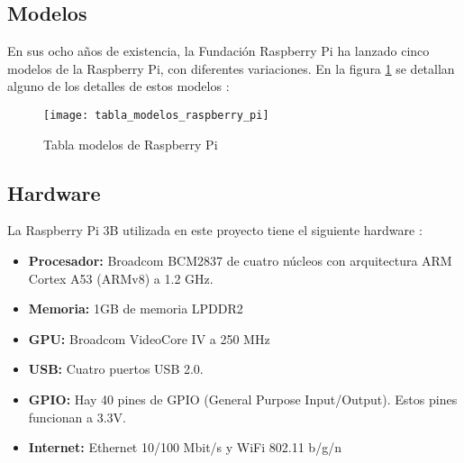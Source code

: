 
        \subsection{Modelos} %
        \label{sub:ModelosRaspberryPi}

            En sus ocho años de existencia, la Fundación Raspberry Pi ha lanzado cinco modelos de la Raspberry Pi, con
            diferentes variaciones. En la figura \ref{fig:ImagenModelosPi} se detallan alguno de los detalles de estos
            modelos \cite{raspberry_pi_wikipedia_en}:

            \begin{figure}[ht]
                \centering
                \texttt{[image: tabla\_modelos\_raspberry\_pi]}
                \caption{Tabla modelos de Raspberry Pi \cite{raspberry_pi_wikipedia_en}\label{fig:ImagenModelosPi}}
            \end{figure}

            \newpage


        \subsection{Hardware} %
        \label{sub:HardwareRaspberryPi}

            La Raspberry Pi 3B utilizada en este proyecto tiene el siguiente hardware \cite{raspberry_pi_hardware}:

            \begin{itemize}
                \item \textbf{Procesador:} Broadcom BCM2837 de cuatro núcleos con arquitectura ARM Cortex A53 (ARMv8) a
                1.2 GHz.
                \item \textbf{Memoria:} 1GB de memoria LPDDR2
                \item \textbf{GPU:} Broadcom VideoCore IV a 250 MHz
                \item \textbf{USB:} Cuatro puertos USB 2.0.
                \item \textbf{GPIO:} Hay 40 pines de GPIO (General Purpose Input/Output). Estos pines funcionan a 3.3V.
                \item \textbf{Internet:} Ethernet 10/100 Mbit/s y WiFi 802.11 b/g/n
            \end{itemize}

